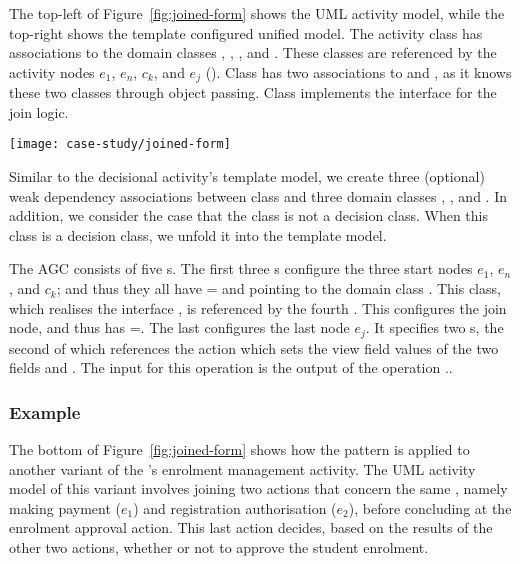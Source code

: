The top-left of Figure~\ref{fig:joined-form} shows the UML activity model, while the top-right shows the template configured unified model. The activity class  has associations to the domain classes , , , and . These classes are referenced by the activity nodes $ e_1 $, $ e_n $, $ c_k $, and $ e_j $ (\resp). Class  has two associations to  and , as it knows these two classes through object passing. Class  implements the interface  for the join logic.

\begin{figure*}[ht]
\begin{center}
\texttt{[image: case-study/joined-form]}
\end{center}
\caption{The joined pattern form.} %
\label{fig:joined-form}
\end{figure*}

Similar to the decisional activity's template model, we create three (optional) weak dependency associations between class  and three domain classes , , and . In addition, we consider the case that the class  is not a decision class. When this class is a decision class, we unfold it into the template model.

The AGC consists of five s. The first three s configure the three start nodes $ e_1 $, $ e_n $, and $ c_k $; and thus they all have = and  pointing to the domain class . This class, which realises the interface , is referenced by the fourth . This  configures the join node, and thus has =. The last  configures the last node $ e_j $. It specifies two s, the second of which references the action   which sets the view field values of the two fields  and . The input for this operation is the output of the operation ..
%
\subsubsection*{Example}
The bottom of Figure~\ref{fig:joined-form} shows how the pattern is applied to another variant of the \courseman's enrolment management activity. The UML activity model of this variant involves joining two actions that concern the same , namely making payment ($e_1$) and registration authorisation ($e_2$), before concluding at the enrolment approval action. This last action decides, based on the results of the other two actions, whether or not to approve the student enrolment.

